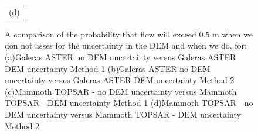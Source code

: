 \documentclass[12pt]{article}
\begin{document}
\begin{figure}[H]
\begin{minipage}{0.6\textwidth}
\begin{tabular}{c}
        (d)
        \end{tabular}
    \end{minipage} 
    \caption{A comparison of the probability that flow will exceed 0.5
      m when we don not asses for the uncertainty in the DEM and when
      we do, for: (a)Galeras ASTER no DEM uncertainty versus Galeras
      ASTER DEM uncertainty Method 1 (b)Galeras ASTER no DEM
      uncertainty versus Galeras ASTER DEM uncertainty Method 2
      (c)Mammoth TOPSAR - no DEM uncertainty versus Mammoth TOPSAR -
      DEM uncertainty Method 1 (d)Mammoth TOPSAR - no DEM uncertainty
      versus Mammoth TOPSAR - DEM uncertainty Method 2}
\label{fig9}  
\end{figure}
\end{document}
